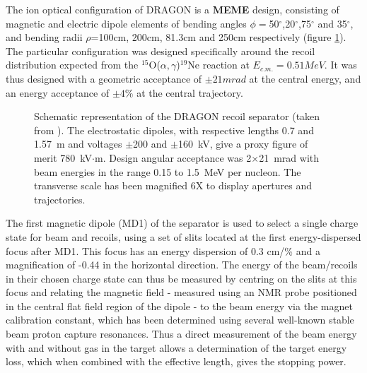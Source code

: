 The ion optical configuration of DRAGON is a {\bf MEME} design, consisting of magnetic and electric  dipole elements of bending angles $\phi=$50$^{\circ}$,20$^{\circ}$,75$^{\circ}$ and 35$^{\circ}$, and bending radii $\rho$=100cm, 200cm, 81.3cm and 250cm respectively (figure \ref{fig:dra_optics}). The particular configuration was designed specifically around the recoil distribution expected from the $^{15}$O($\alpha ,\gamma$)$^{19}$Ne reaction at $E_{c.m.}=0.51 MeV$. It was thus designed with a geometric acceptance of $\pm21mrad$ at the central energy, and an energy acceptance of $\pm4\%$ at the central trajectory. 

\begin{figure}
\caption{Schematic representation of the DRAGON recoil separator (taken from \cite{hut03}). The electrostatic dipoles, with respective lengths 0.7 and 1.57~m and voltages $\pm$200 and $\pm$160~kV, give a proxy figure of merit 780~kV$\cdot$m.  Design angular acceptance was 2$\times$21~mrad with beam energies in the range 0.15 to 1.5~MeV per nucleon. The transverse scale has been magnified 6X to display apertures and trajectories.}
\label{fig:dra_optics}
\end{figure}

The first magnetic dipole (MD1) of the separator is used to select a single charge state for beam and recoils, using a set of slits located at the first energy-dispersed focus after MD1. This focus has an energy dispersion of 0.3 cm/\% and a magnification of -0.44 in the horizontal direction. The energy of the beam/recoils in their chosen charge state can thus be measured by centring on the slits at this focus and relating the magnetic field - measured using an NMR probe positioned in the central flat field region of the dipole - to the beam energy via the magnet calibration constant, which has been determined using several well-known stable beam proton capture resonances. Thus a direct measurement of the beam energy with and without gas in the target allows a determination of the target energy loss, which when combined with the effective length, gives the stopping power. 

